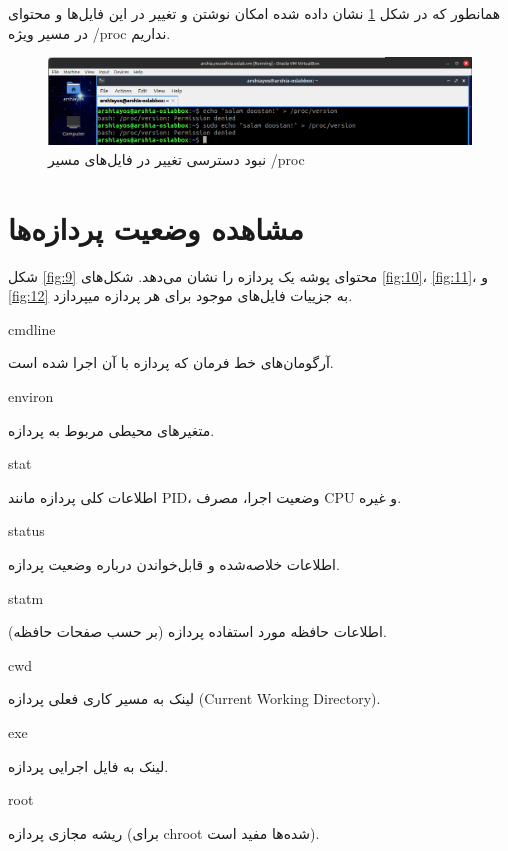 \documentclass[12pt]{article}
\begin{document}
	همانطور که در شکل \ref{fig:8} نشان داده شده امکان نوشتن و تغییر در این فایل‌ها و محتوای در مسیر ویژه /proc نداریم.
	\begin{figure}[H]
		\centering
		\includegraphics[width=\textwidth]{report3-resources/8.png}
		\caption{نبود دسترسی تغییر در فایل‌های مسیر \textenglish{/proc}}
		\label{fig:8}
	\end{figure}
	
	\newpage
	\section{مشاهده وضعیت پردازه‌ها}
	
	شکل \ref{fig:9} محتوای پوشه یک پردازه را نشان می‌دهد. شکل‌های \ref{fig:10}،
	\ref{fig:11}، و
	\ref{fig:12}
	 به جزییات فایل‌های موجود برای هر پردازه‌ میپردازد.
	 
	 cmdline
	 
	  آرگومان‌های خط فرمان که پردازه با آن اجرا شده است.
	 
	 environ
	 
	  متغیرهای محیطی مربوط به پردازه.

	 stat
	 
	  اطلاعات کلی پردازه مانند PID، وضعیت اجرا، مصرف CPU و غیره.
	 
	 status
	 
	  اطلاعات خلاصه‌شده و قابل‌خواندن درباره وضعیت پردازه.
	 
	 statm
	 
	  اطلاعات حافظه مورد استفاده پردازه (بر حسب صفحات حافظه).
	 
	 cwd
	 
	  لینک به مسیر کاری فعلی پردازه \textenglish{(Current Working Directory)}.
	 
	 exe
	 
	  لینک به فایل اجرایی پردازه.
	 
	 root
	 
	  ریشه مجازی پردازه (برای chroot شده‌ها مفید است).
\end{document}
